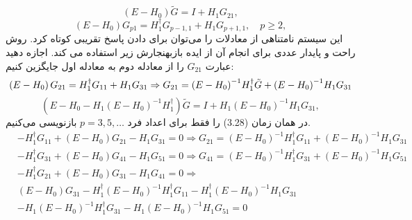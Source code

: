 \begin{equation}
    \left( E-{{H}_{0}} \right)\tilde{G}=I+{{H}_{1}}{{G}_{21}},
\end{equation}
\begin{equation}
    \left( E-{{H}_{0}} \right){{G}_{p1}}=H_{1}^{\dagger }{{G}_{p-1,1}}+{{H}_{1}}{{G}_{p+1,1}},\quad p\ge 2,
\end{equation}
این سیستم نامتناهی از معادلات را می‌توان برای دادن پاسخ تقریبی کوتاه کرد. روش راحت و پایدار عددی برای انجام آن از ایده بازبهنجارش زیر استفاده می کند. اجازه دهید عبارت $G_{21}$ را از معادله دوم به معادله اول جایگزین کنیم:
\begin{equation}
    \left( E-{{H}_{0}} \right){{G}_{21}}=H_{1}^{\dagger }{{G}_{11}}+{{H}_{1}}{{G}_{31}}\Rightarrow {{G}_{21}}={{\left( E-{{H}_{0}} \right)}^{-1}}H_{1}^{\dagger }\tilde{G}+{{\left( E-{{H}_{0}} \right)}^{-1}}{{H}_{1}}{{G}_{31}}\\
\end{equation}
\begin{equation}
    \left( E-{{H}_{0}}-{{H}_{1}}{{\left( E-{{H}_{0}} \right)}^{-1}}H_{1}^{\dagger } \right)\tilde{G}=I+{{H}_{1}}{{\left( E-{{H}_{0}} \right)}^{-1}}{{H}_{1}}{{G}_{31}},
\end{equation}
در همان زمان (3.28) را فقط برای اعداد فرد $p = 3,5,\dots$ بازنویسی می‌کنیم.
\begin{equation}
    \begin{aligned}
          & -H_{1}^{\dagger }{{G}_{11}}+\left( E-{{H}_{0}} \right){{G}_{21}}-{{H}_{1}}{{G}_{31}}=0\Rightarrow {{G}_{21}}={{\left( E-{{H}_{0}} \right)}^{-1}}H_{1}^{\dagger }{{G}_{11}}+{{\left( E-{{H}_{0}} \right)}^{-1}}{{H}_{1}}{{G}_{31}} \\ 
         & -H_{1}^{\dagger }{{G}_{31}}+\left( E-{{H}_{0}} \right){{G}_{41}}-{{H}_{1}}{{G}_{51}}=0\Rightarrow {{G}_{41}}={{\left( E-{{H}_{0}} \right)}^{-1}}H_{1}^{\dagger }{{G}_{31}}+{{\left( E-{{H}_{0}} \right)}^{-1}}{{H}_{1}}{{G}_{51}} \\ 
         & -H_{1}^{\dagger }{{G}_{21}}+\left( E-{{H}_{0}} \right){{G}_{31}}-{{H}_{1}}{{G}_{41}}=0\Rightarrow  \\ 
         & \left( E-{{H}_{0}} \right){{G}_{31}}-H_{1}^{\dagger }{{\left( E-{{H}_{0}} \right)}^{-1}}H_{1}^{\dagger }{{G}_{11}}-H_{1}^{\dagger }{{\left( E-{{H}_{0}} \right)}^{-1}}{{H}_{1}}{{G}_{31}} \\ 
         & -{{H}_{1}}{{\left( E-{{H}_{0}} \right)}^{-1}}H_{1}^{\dagger }{{G}_{31}}-{{H}_{1}}{{\left( E-{{H}_{0}} \right)}^{-1}}{{H}_{1}}{{G}_{51}}=0 \\ 
    \end{aligned}
\end{equation}
